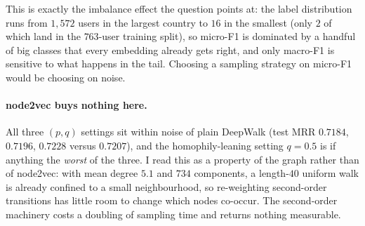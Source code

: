 This is exactly the imbalance effect the question points at: the label distribution runs
from $1{,}572$ users in the largest country to $16$ in the smallest (only $2$ of which land
in the $763$-user training split), so micro-F1 is dominated by a handful of big classes
that every embedding already gets right, and only macro-F1 is sensitive to what happens in
the tail.  Choosing a sampling strategy on micro-F1 would be choosing on noise.

\paragraph{node2vec buys nothing here.}
All three $(p,q)$ settings sit within noise of plain DeepWalk (test MRR $0.7184$,
$0.7196$, $0.7228$ versus $0.7207$), and the homophily-leaning setting $q{=}0.5$ is if
anything the \emph{worst} of the three.  I read this as a property of the graph rather
than of node2vec: with mean degree $5.1$ and $734$ components, a length-$40$ uniform walk
is already confined to a small neighbourhood, so re-weighting second-order transitions
has little room to change which nodes co-occur.  The second-order machinery costs a
doubling of sampling time and returns nothing measurable.

